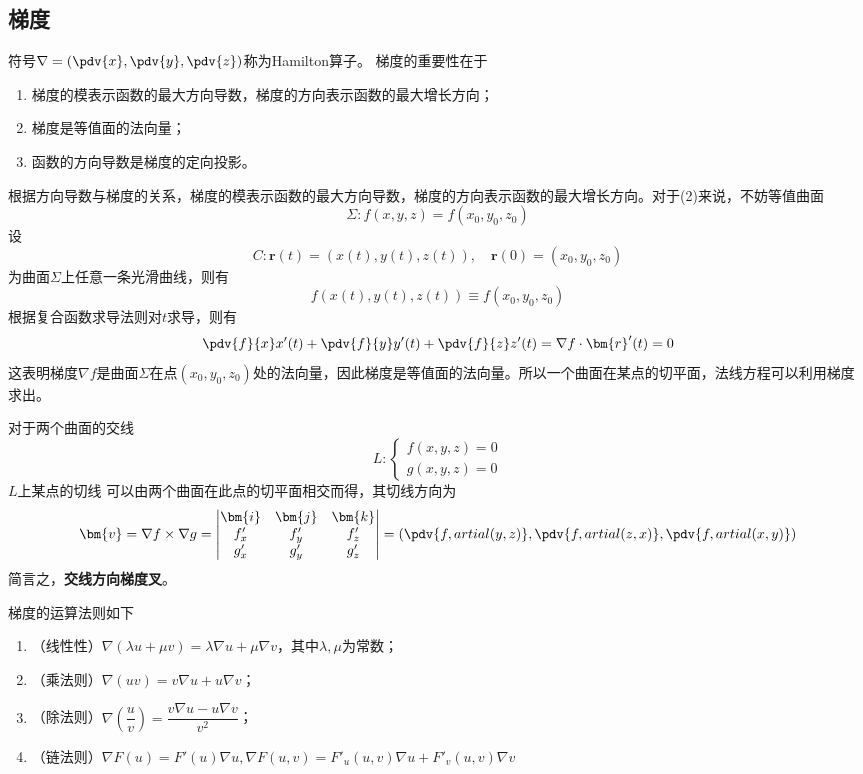 \subsection{梯度}
符号$\nabla=\left(\pdv{x},\pdv{y},\pdv{z}\right)$称为Hamilton算子。
梯度的重要性在于
\begin{enumerate}[(1)]
    \item 梯度的模表示函数的最大方向导数，梯度的方向表示函数的最大增长方向；
    \item 梯度是等值面的法向量；
    \item 函数的方向导数是梯度的定向投影。
\end{enumerate}

根据方向导数与梯度的关系，梯度的模表示函数的最大方向导数，梯度的方向表示函数的最大增长方向。对于(2)来说，不妨等值曲面
\[ \Sigma : f(x,y,z) = f(x_0,y_0,z_0) \]
设
\[ C: \bm{r}(t) = (x(t),y(t),z(t)),\quad \bm{r}(0) = (x_0,y_0,z_0) \]
为曲面$\Sigma$上任意一条光滑曲线，则有
\[ f(x(t),y(t),z(t)) \equiv f(x_0,y_0,z_0) \]
根据复合函数求导法则对$t$求导，则有
\[
    \pdv{f}{x} x'(t) + \pdv{f}{y} y'(t) + \pdv{f}{z} z'(t)
    = \nabla f\cdot\bm{r}'(t)
    = 0
\]
这表明梯度$\nabla f$是曲面$\Sigma$在点$(x_0,y_0,z_0)$处的法向量，因此梯度是等值面的法向量。所以一个曲面在某点的切平面，法线方程可以利用梯度求出。

对于两个曲面的交线
\[
    L :
    \begin{cases}
        f(x,y,z) = 0 \\
        g(x,y,z) = 0
    \end{cases}
\]
$L$上某点的切线
可以由两个曲面在此点的切平面相交而得，其切线方向为
\[
    \bm{v} = \nabla f \times \nabla g
    =
    \begin{vmatrix}
        \bm{i} & \bm{j} & \bm{k} \\
        f'_x   & f'_y   & f'_z   \\
        g'_x   & g'_y   & g'_z
    \end{vmatrix}
    = \left(\pdv{f,artial(y,z)}, \pdv{f,artial(z,x)},\pdv{f,artial(x,y)}\right)
\]
简言之，\textbf{\textsf{交线方向梯度叉}}。

梯度的运算法则如下
\begin{enumerate}[(1)]
    \item （线性性）$\nabla (\lambda u + \mu v) = \lambda \nabla u + \mu \nabla v$，其中$\lambda,\mu$为常数；
    \item （乘法则）$\nabla(uv) = v\nabla u + u\nabla v$；
    \item （除法则）$\nabla\left(\dfrac{u}{v}\right) = \dfrac{v\nabla u - u\nabla v}{v^2}$；
    \item （链法则）$\nabla F(u) = F'(u)\nabla u, \nabla F(u,v) = F'_u(u,v)\nabla u + F'_v(u,v)\nabla v$
\end{enumerate}

